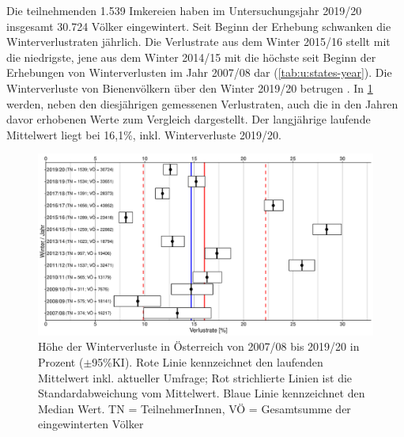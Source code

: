 Die teilnehmenden 1.539 Imkereien haben im Untersuchungsjahr 2019/20 insgesamt 30.724 Völker eingewintert. Seit Beginn der Erhebung schwanken die Winterverlustraten jährlich. Die Verlustrate aus dem Winter 2015/16 stellt mit  die niedrigste, jene aus dem Winter 2014/15 mit  die höchste seit Beginn der Erhebungen von Winterverlusten im Jahr 2007/08 dar (\cref{tab:u:states-year}). Die Winterverluste von Bienenvölkern über den Winter 2019/20 betrugen . In \cref{fig:u:years:losses} werden, neben den diesjährigen gemessenen Verlustraten, auch die in den Jahren davor erhobenen Werte zum Vergleich dargestellt. Der langjährige laufende Mittelwert liegt bei 16,1\%, inkl. Winterverluste 2019/20.

\begin{figure}[H]
  \centering
  \includegraphics[keepaspectratio,width=1\textwidth]{project-U-wintersterblichkeit/figures/plot_years_losses}
  \caption{Höhe der Winterverluste in Österreich von 2007/08 bis 2019/20 in Prozent ($\pm$95\%KI). Rote Linie kennzeichnet den laufenden Mittelwert inkl. aktueller Umfrage; Rot strichlierte Linien ist die Standardabweichung vom Mittelwert. Blaue Linie kennzeichnet den Median Wert. TN = TeilnehmerInnen, VÖ = Gesamtsumme der eingewinterten Völker}
  \label{fig:u:years:losses}
\end{figure}


